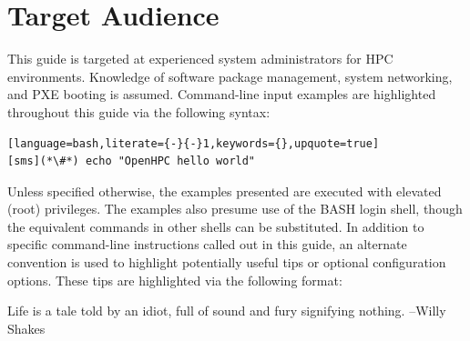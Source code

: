 \section{Target Audience}

This guide is targeted at experienced \Linux{} system administrators for HPC
environments. Knowledge of software package management, system networking, and
PXE booting is assumed. Command-line input examples are highlighted throughout
this guide via the following syntax:

\begin{lstlisting}[language=bash,literate={-}{-}1,keywords={},upquote=true]
[sms](*\#*) echo "OpenHPC hello world"
\end{lstlisting}

Unless specified otherwise, the examples presented are executed with
elevated (root) privileges. The examples also presume use of the BASH login
shell, though the equivalent commands in other shells can be substituted.
In addition to specific command-line instructions called out in this guide, an
alternate convention is used to highlight potentially useful tips or optional
configuration options. These tips are highlighted via the following format:

\begin{center}
\begin{tcolorbox}[]
\small  Life is a tale told by an idiot, full of sound and fury signifying nothing. --Willy Shakes
\end{tcolorbox}
\end{center}

